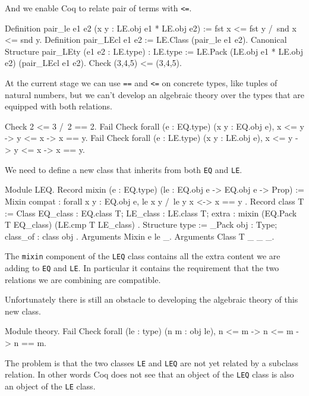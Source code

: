 And we enable Coq to relate pair of terms with \texttt{<=}.

\begin{coq_example}
Definition pair_le e1 e2 (x y : LE.obj e1 * LE.obj e2) :=
  fst x <= fst y /\ snd x <= snd y.
Definition pair_LEcl e1 e2 := LE.Class (pair_le e1 e2).
Canonical Structure pair_LEty (e1 e2 : LE.type) : LE.type :=
  LE.Pack (LE.obj e1 * LE.obj e2) (pair_LEcl e1 e2).
Check (3,4,5) <= (3,4,5).
\end{coq_example}

At the current stage we can use \texttt{==} and \texttt{<=} on concrete types,
like tuples of natural numbers, but we can't develop an algebraic
theory over the types that are equipped with both relations.

\begin{coq_example}
Check 2 <= 3 /\ 2 == 2.
Fail Check forall (e : EQ.type) (x y : EQ.obj e), x <= y -> y <= x -> x == y.
Fail Check forall (e : LE.type) (x y : LE.obj e), x <= y -> y <= x -> x == y.
\end{coq_example}

We need to define a new class that inherits from both \texttt{EQ} and \texttt{LE}.

\begin{coq_example}
Module LEQ.
  Record mixin (e : EQ.type) (le : EQ.obj e -> EQ.obj e -> Prop) :=
    Mixin { compat : forall x y : EQ.obj e, le x y /\ le y x <-> x == y }.
  Record class T := Class {
    EQ_class    : EQ.class T;
    LE_class    : LE.class T;
    extra : mixin (EQ.Pack T EQ_class) (LE.cmp T LE_class) }.
  Structure type := _Pack { obj : Type; class_of : class obj }.
  Arguments Mixin {e le} _.
  Arguments Class {T} _ _ _.
\end{coq_example}

The \texttt{mixin} component of the \texttt{LEQ} class contains all the extra content
we are adding to \texttt{EQ} and \texttt{LE}.  In particular it contains the requirement
that the two relations we are combining are compatible.

Unfortunately there is still an obstacle to developing the algebraic theory
of this new class.

\begin{coq_example}
  Module theory.
  Fail Check forall (le : type) (n m : obj le), n <= m -> n <= m -> n == m.
\end{coq_example}

The problem is that the two classes \texttt{LE} and \texttt{LEQ} are not yet related by
a subclass relation.  In other words Coq does not see that an object
of the \texttt{LEQ} class is also an object of the \texttt{LE} class.

